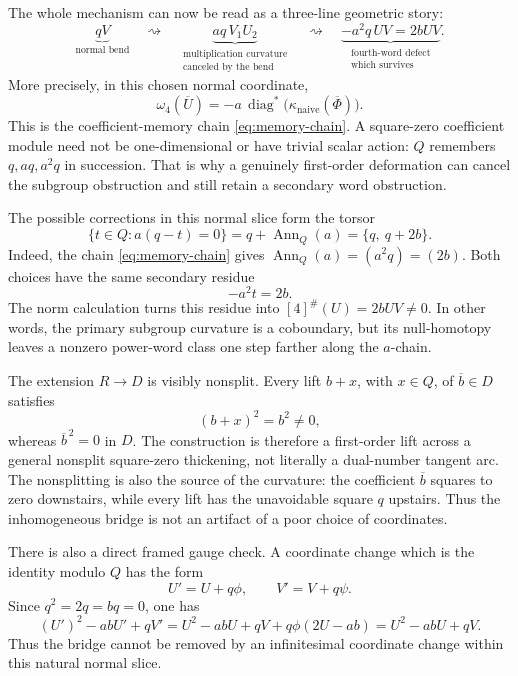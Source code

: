 \documentclass[11pt]{amsart}
\theoremstyle{definition}
\theoremstyle{remark}
\begin{document}
The whole mechanism can now be read as a three-line geometric story:
\begin{equation}\label{eq:three-stage-deformation-story}
 \underbrace{qV}_{\text{normal bend}}
 \quad\rightsquigarrow\quad
 \underbrace{aq\,V_1U_2}_{\substack{\text{multiplication curvature}\\
                                      \text{canceled by the bend}}}
 \quad\rightsquigarrow\quad
 \underbrace{-a^2q\,UV=2bUV}_{\substack{\text{fourth-word defect}\\
                                         \text{which survives}}}.
\end{equation}
More precisely, in this chosen normal coordinate,
\[
 \omega_4(\overline U)
 =-a\,\operatorname{diag}^*
   \bigl(\kappa_{\mathrm{naive}}(\overline\Phi)\bigr).
\]
This is the coefficient-memory chain \eqref{eq:memory-chain}.  A
square-zero coefficient module need not be one-dimensional or have
trivial scalar action: \(Q\) remembers \(q,aq,a^2q\) in succession.
That is why a genuinely first-order deformation can cancel the subgroup
obstruction and still retain a secondary word obstruction.

The possible corrections in this normal slice form the torsor
\begin{equation}\label{eq:bridge-torsor}
 \{t\in Q:a(q-t)=0\}
 =q+\operatorname{Ann}_Q(a)
 =\{q,\ q+2b\}.
\end{equation}
Indeed, the chain \eqref{eq:memory-chain} gives
\(\operatorname{Ann}_Q(a)=(a^2q)=(2b)\).  Both choices have the same
secondary residue
\[
 -a^2t=2b.
\]
The norm calculation turns this residue into
\([4]^\#(U)=2bUV\ne0\).  In other words, the primary subgroup curvature
is a coboundary, but its null-homotopy leaves a nonzero power-word class
one step farther along the \(a\)-chain.

The extension \(R\to D\) is visibly nonsplit.  Every lift \(b+x\), with
\(x\in Q\), of \(\overline b\in D\) satisfies
\[
 (b+x)^2=b^2\ne0,
\]
whereas \(\overline b^{\,2}=0\) in \(D\).  The construction is therefore
a first-order lift across a general nonsplit square-zero thickening, not
literally a dual-number tangent arc.  The nonsplitting is also the source
of the curvature: the coefficient \(\overline b\) squares to zero
downstairs, while every lift has the unavoidable square \(q\) upstairs.
Thus the inhomogeneous bridge is not an artifact of a poor choice of
coordinates.

There is also a direct framed gauge check.  A coordinate change which is
the identity modulo \(Q\) has the form
\[
 U'=U+q\phi,\qquad V'=V+q\psi.
\]
Since \(q^2=2q=bq=0\), one has
\[
 (U')^2-abU'+qV'
 =U^2-abU+qV+q\phi(2U-ab)
 =U^2-abU+qV.
\]
Thus the bridge cannot be removed by an infinitesimal coordinate change
within this natural normal slice.
\end{document}
